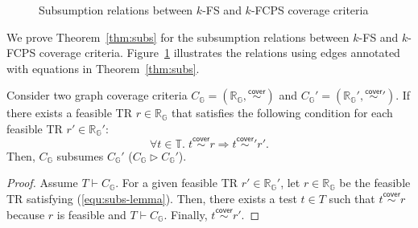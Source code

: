 \documentclass[acmsmall,review,screen]{acmart}
\newcommand{\name}[1]{\textsf{#1}}
\newcommand{\graph}{\mathbb{G}}
\newcommand{\node}{n}
\newcommand{\testset}{\mathbb{T}}
\newcommand{\test}{t}
\newcommand{\cover}{\overset{\name{cover}}{\sim}}
\newcommand{\trset}[1]{\mathbb{R}_{#1}}
\newcommand{\tr}{r}
\newcommand{\cov}[1]{C_{#1}}
\newcommand{\sat}{\vdash}
\newcommand{\fcov}[1]{\cov{#1}^{\name{FS}}}
\newcommand{\kfcov}[2]{\cov{#2}^{{#1}\name{-FS}}}
\newcommand{\subs}{\rhd}
\newcommand{\fcpcov}[1]{\cov{#1}^{\name{FCPS}}}
\newcommand{\kfcpcov}[2]{\cov{#2}^{{#1}\name{-FCPS}}}
\begin{document}

\begin{figure}
  \centering
\scriptsize
\vspace*{-1em}
  \caption{
    Subsumption relations between $k$-FS and $k$-FCPS coverage criteria
  }
\vspace*{-1em}
  \label{fig:subs}
\end{figure}

We prove Theorem~\ref{thm:subs} for the subsumption relations
between $k$-FS and $k$-FCPS coverage criteria.
Figure~\ref{fig:subs} illustrates the relations using edges
annotated with equations in Theorem~\ref{thm:subs}.


\begin{lemma}\label{lem:subs}
  Consider two graph coverage criteria $\cov{\graph} = (\trset{\graph}, \cover)$
  and $\cov{\graph}' = (\trset{\graph}', \cover')$.
  If there exists a feasible TR $\tr \in \trset{\graph}$ that satisfies the following
  condition for each feasible TR $\tr' \in \trset{\graph}'$:
  \begin{equation}\label{equ:subs-lemma}
    \forall \test \in \testset. \; \test \cover \tr \Rightarrow \test \cover' \tr'.
  \end{equation}
  Then, $\cov{\graph}$ subsumes $\cov{\graph}'$ ($\cov{\graph}
  \subs\cov{\graph}'$).
\end{lemma}
\begin{proof}
  Assume $T \sat \cov{\graph}$.
  For a given feasible TR $\tr' \in \trset{\graph}'$, let $\tr \in \trset{\graph}$
  be the feasible TR satisfying (\ref{equ:subs-lemma}).
  Then, there exists a test $\test \in T$ such that $\test \cover \tr$ because
  $\tr$ is feasible and $T \sat \cov{\graph}$.
  Finally, $\test \cover \tr'$.
\end{proof}
\end{document}
